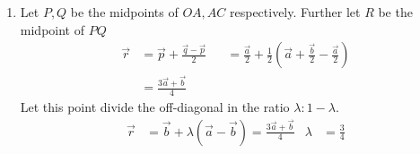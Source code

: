 \begin{enumerate}
\begin{enumerate}
                    \begin{figure}[H]
                        \centering
                    \end{figure}

              \item Let $ P, Q $ be the midpoints of $ OA, AC $ respectively. Further let
                    $ R $ be the midpoint of $ PQ $
                    \begin{align}
                        \vec{r} & = \vec{p} + \frac{\vec{q} - \vec{p}}{2} &
                                & = \frac{\vec{a}}{2}
                        + \frac{1}{2}\left( \vec{a} + \frac{\vec{b}}{2}
                        - \frac{\vec{a}}{2} \right)                         \\
                                & =\frac{3\vec{a} + \vec{b}}{4}
                    \end{align}
                    Let this point divide the off-diagonal in the ratio
                    $ \lambda : 1 - \lambda $.
                    \begin{align}
                        \vec{r}                        & =
                        \vec{b} + \lambda (\vec{a} - \vec{b})
                        = \frac{3\vec{a} + \vec{b}}{4} &
                        \lambda                        & = \frac{3}{4}
                    \end{align}



\end{enumerate}
\end{enumerate}
